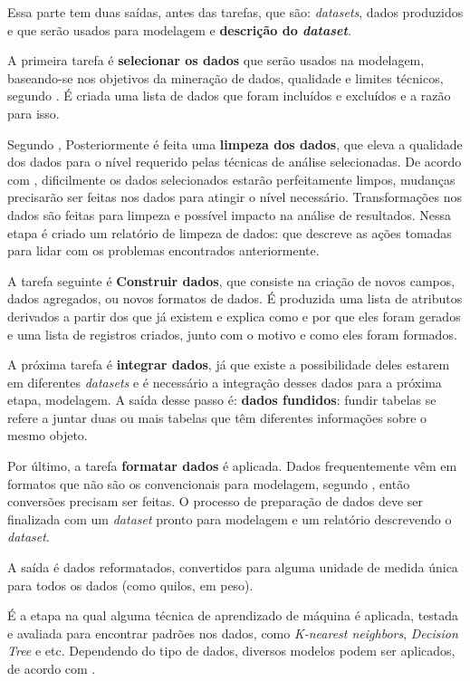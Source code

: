 Essa parte tem duas saídas, antes das tarefas, que são: \textit{datasets}, dados produzidos e que serão usados para modelagem e \textbf{descrição do \textit{dataset}}.

A primeira tarefa é \textbf{selecionar os dados} que serão usados na modelagem, baseando-se nos objetivos da mineração de dados, qualidade e limites técnicos, segundo . É criada uma lista de dados que foram incluídos e excluídos e a razão para isso.

Segundo , Posteriormente é feita uma \textbf{limpeza dos dados}, que eleva a qualidade dos dados para o nível requerido pelas técnicas de análise selecionadas. De acordo com , dificilmente os dados selecionados estarão perfeitamente limpos, mudanças precisarão ser feitas nos dados para atingir o nível necessário. Transformações nos dados são feitas para limpeza e possível impacto na análise de resultados. Nessa etapa é criado um relatório de limpeza de dados: que descreve as ações tomadas para lidar com os problemas encontrados anteriormente.

A tarefa seguinte é \textbf{Construir dados}, que consiste na criação de novos campos, dados agregados, ou novos formatos de dados. É produzida uma lista de atributos derivados a partir dos que já existem e explica como e por que eles foram gerados e uma lista de registros criados, junto com o motivo e como eles foram formados.

A próxima tarefa é \textbf{integrar dados}, já que existe a possibilidade deles estarem em diferentes \textit{datasets} e é necessário a integração desses dados para a próxima etapa, modelagem. A saída desse passo é: \textbf{dados fundidos}: fundir tabelas se refere a juntar duas ou mais tabelas que têm diferentes informações sobre o mesmo objeto. 

Por último, a tarefa \textbf{formatar dados} é aplicada. Dados frequentemente vêm em formatos que não são os convencionais para modelagem, segundo , então conversões precisam ser feitas. O processo de preparação de dados deve ser finalizada com um \textit{dataset} pronto para modelagem e um relatório descrevendo o \textit{dataset}.

A saída é dados reformatados, convertidos para alguma unidade de medida única para todos os dados (como quilos, em peso).

É a etapa na qual alguma técnica de aprendizado de máquina é aplicada, testada e avaliada para encontrar padrões nos dados, como \textit{K-nearest neighbors}, \textit{Decision Tree }e etc. Dependendo do tipo de dados, diversos modelos podem ser aplicados, de acordo com .

